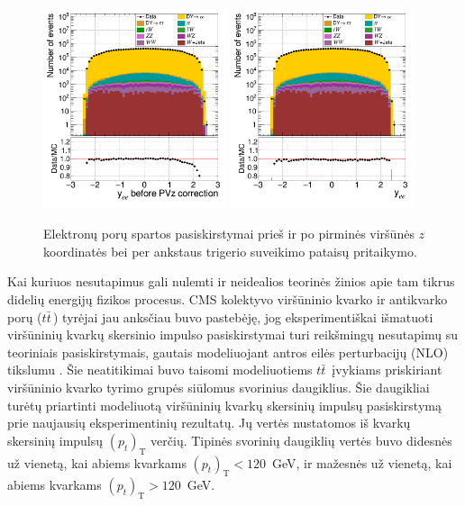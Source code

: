 \documentclass[a4paper, 12pt, oneside]{article}
\newcommand{\ttbar}{t\bar{t}}
\begin{document}
\begin{figure}[b!]
	\includegraphics[width=0.48\textwidth]{Magistrinis/ee_rapi_before.png}
	\includegraphics[width=0.48\textwidth]{Magistrinis/ee_rapi_after.png}
	\vspace{-0.5cm}
	\caption{\label{fig:rapiba} Elektronų porų spartos pasiskirstymai prieš ir po pirminės viršūnės $z$ koordinatės bei per ankstaus
	trigerio suveikimo pataisų pritaikymo.}
\end{figure}

Kai kuriuos nesutapimus gali nulemti ir neidealios teorinės žinios apie tam tikrus didelių energijų fizikos procesus.
CMS kolektyvo viršūninio kvarko ir antikvarko porų ($\ttbar\,$) tyrėjai jau anksčiau buvo pastebėję, jog eksperimentiškai
išmatuoti viršūninių kvarkų skersinio impulso pasiskirstymai turi reikšmingų nesutapimų su teoriniais pasiskirstymais,
gautais modeliuojant antros eilės perturbacijų (NLO) tikslumu \cite{ttbarPT}.
Šie neatitikimai buvo taisomi modeliuotiems $\ttbar\,$ įvykiams priskiriant viršūninio kvarko tyrimo grupės
siūlomus svorinius daugiklius.
Šie daugikliai turėtų priartinti modeliuotą viršūninių kvarkų skersinių impulsų pasiskirstymą prie naujausių eksperimentinių rezultatų.
Jų vertės nustatomos iš kvarkų skersinių impulsų $(p_{t})_{\mathrm{T}}$ verčių.
Tipinės svorinių daugiklių vertės buvo didesnės už vienetą, kai abiems kvarkams $(p_{t})_{\mathrm{T}}<120$~GeV, ir mažesnės už vienetą,
kai abiems kvarkams $(p_{t})_{\mathrm{T}}>120$~GeV.
\end{document}
